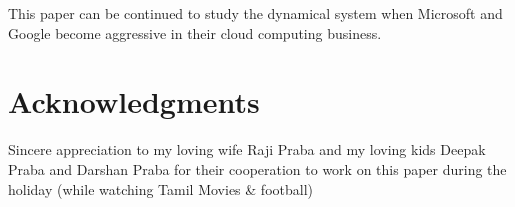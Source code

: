 \documentclass[fleqn,10pt]{SelfArx} %
\begin{document}
This paper can be continued to study the dynamical system when Microsoft and Google become aggressive in their cloud computing business. 

\section*{Acknowledgments} %


Sincere appreciation to my loving wife Raji Praba and my loving kids Deepak Praba and Darshan Praba for their cooperation to work on this paper during the holiday (while watching Tamil Movies \& football)





\end{document}
